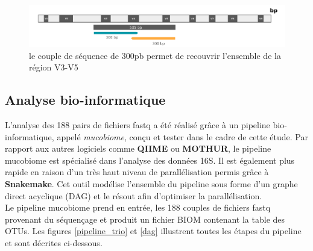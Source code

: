 \documentclass[12pt,a4paper]{article}
\begin{document}
\begin{figure}[ht]
\begin{center}
\includegraphics[scale=0.6]{img/illumina.png}\hfill
\end{center}
\caption{le couple de séquence de 300pb permet de recouvrir l'ensemble de la région V3-V5}
\label{illumina}
\end{figure}


\subsection{Analyse bio-informatique}

L’analyse des 188 pairs de fichiers fastq a été réalisé grâce à un pipeline bio-informatique, appelé \textit{mucobiome}, conçu et tester dans le cadre de cette étude. Par rapport aux autres logiciels comme \textbf{QIIME} ou \textbf{MOTHUR}, le pipeline mucobiome est spécialisé dans l’analyse des données 16S. Il est également plus rapide en raison d’un très haut niveau de parallélisation permis grâce à  \textbf{Snakemake}. Cet outil modélise l'ensemble du pipeline sous forme d'un graphe direct acyclique (DAG) et le résout afin d'optimiser la parallélisation. \\
Le pipeline mucobiome prend en entrée, les 188 couples de fichiers fastq provenant du séquençage et produit un fichier BIOM contenant la table des OTUs. Les figures \ref{pipeline_trio} et \ref{dag} illustrent toutes les étapes du pipeline et sont décrites ci-dessous.
\end{document}
